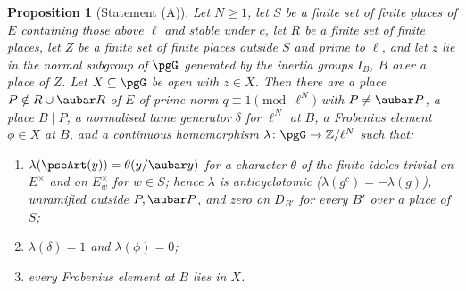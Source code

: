 \documentclass[10pt]{amsart}
\newtheorem{proposition}[theorem]{Proposition}
\theoremstyle{definition}
\theoremstyle{remark}
\newcommand{\Z}{\mathbb Z}
\begin{document}
\begin{proposition}[Statement (A)]\label{pse:A}
Let $N\ge1$, let $S$ be a finite set of finite places of $E$ containing those above $\ell$ and
stable under $c$, let $R$ be a finite set of finite places, let $Z$ be a finite set of finite places
outside $S$ and prime to $\ell$, and let $z$ lie in the normal subgroup of $\pgG$ generated by the
inertia groups $I_B$, $B$ over a place of $Z$. Let $X\subseteq\pgG$ be open with $z\in X$. Then
there are a place $P\notin R\cup\aubar R$ of $E$ of prime norm $q\equiv1\pmod{\ell^N}$ with
$P\ne\aubar P$, a place $B\mid P$, a normalised tame generator $\delta$ for $\ell^N$ at $B$, a
Frobenius element $\phi\in X$ at $B$, and a continuous homomorphism $\lambda\colon\pgG\to\Z/\ell^N$
such that:
\begin{enumerate}
\item[(i)] $\lambda(\pseArt(y))=\theta(y/\aubar y)$ for a character $\theta$ of the finite ideles
trivial on $E^\times$ and on $E_w^\times$ for $w\in S$; hence $\lambda$ is anticyclotomic
($\lambda(g^c)=-\lambda(g)$), unramified outside $P,\aubar P$, and zero on $D_{B'}$ for every
$B'$ over a place of $S$;
\item[(ii)] $\lambda(\delta)=1$ and $\lambda(\phi)=0$;
\item[(iii)] every Frobenius element at $B$ lies in $X$.
\end{enumerate}
\end{proposition}
\end{document}
